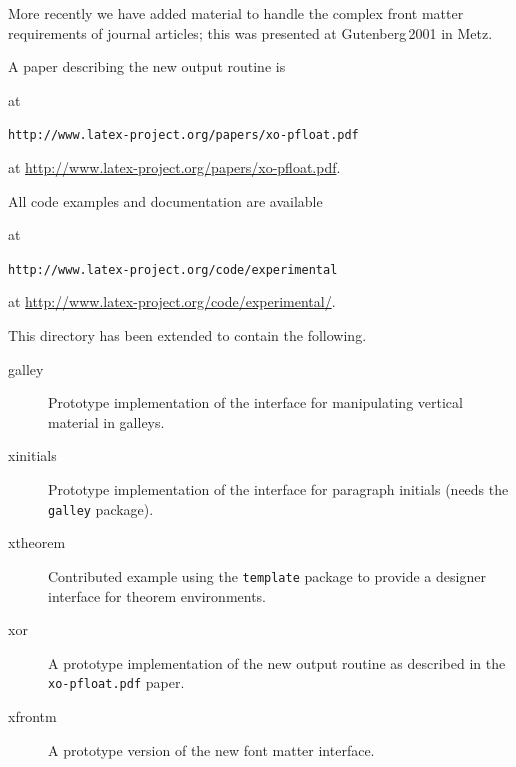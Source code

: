 \documentclass{ltnews}
\providecommand\pkg[1]{\texttt{#1}}
\providecommand\file[1]{\texttt{#1}}
\begin{document}
More recently we have added material to handle the complex front
matter requirements of journal articles; this was presented at
Gutenberg\,2001 in Metz.

A paper describing the new output routine is
\begin{latexonly}
  at\\
\begin{small}
  \file{http://www.latex-project.org/papers/xo-pfloat.pdf}\\
\end{small}
\end{latexonly}
\begin{htmlonly}
  at \url{http://www.latex-project.org/papers/xo-pfloat.pdf}.
\end{htmlonly}
All code examples and documentation are available
\begin{latexonly}
  at\\
\begin{small}
   \file{http://www.latex-project.org/code/experimental}
\end{small}
\end{latexonly}
\begin{htmlonly}
  at \url{http://www.latex-project.org/code/experimental/}.
\end{htmlonly}

This directory has been extended to contain the following.
\begin{description}
 \item[galley] Prototype implementation of the interface\latex{\\}
   for manipulating vertical material in galleys.
 \item[xinitials] Prototype implementation of the interface\latex{\\}
   for paragraph initials (needs the \pkg{galley} package).
 \item[xtheorem] Contributed example using the \pkg{template}
   package to provide a designer interface for theorem environments.
 \item[xor] A prototype implementation of the new output routine
   as described in the \file{xo-pfloat.pdf} paper.
 \item[xfrontm] A prototype version of
   the new font matter interface.
\end{description}
\end{document}
